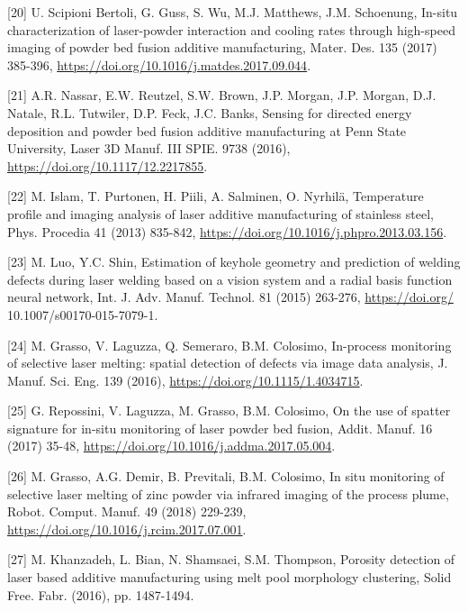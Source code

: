 \documentclass[10pt]{article}
\begin{document}
[20] U. Scipioni Bertoli, G. Guss, S. Wu, M.J. Matthews, J.M. Schoenung, In-situ characterization of laser-powder interaction and cooling rates through high-speed imaging of powder bed fusion additive manufacturing, Mater. Des. 135 (2017) 385-396, \href{https://doi.org/10.1016/j.matdes.2017.09.044}{https://doi.org/10.1016/j.matdes.2017.09.044}.

[21] A.R. Nassar, E.W. Reutzel, S.W. Brown, J.P. Morgan, J.P. Morgan, D.J. Natale, R.L. Tutwiler, D.P. Feck, J.C. Banks, Sensing for directed energy deposition and powder bed fusion additive manufacturing at Penn State University, Laser 3D Manuf. III SPIE. 9738 (2016), \href{https://doi.org/10.1117/12.2217855}{https://doi.org/10.1117/12.2217855}.

[22] M. Islam, T. Purtonen, H. Piili, A. Salminen, O. Nyrhilä, Temperature profile and imaging analysis of laser additive manufacturing of stainless steel, Phys. Procedia 41 (2013) 835-842, \href{https://doi.org/10.1016/j.phpro.2013.03.156}{https://doi.org/10.1016/j.phpro.2013.03.156}.

[23] M. Luo, Y.C. Shin, Estimation of keyhole geometry and prediction of welding defects during laser welding based on a vision system and a radial basis function neural network, Int. J. Adv. Manuf. Technol. 81 (2015) 263-276, \href{https://doi.org/}{https://doi.org/} 10.1007/s00170-015-7079-1.

[24] M. Grasso, V. Laguzza, Q. Semeraro, B.M. Colosimo, In-process monitoring of selective laser melting: spatial detection of defects via image data analysis, J. Manuf. Sci. Eng. 139 (2016), \href{https://doi.org/10.1115/1.4034715}{https://doi.org/10.1115/1.4034715}.

[25] G. Repossini, V. Laguzza, M. Grasso, B.M. Colosimo, On the use of spatter signature for in-situ monitoring of laser powder bed fusion, Addit. Manuf. 16 (2017) 35-48, \href{https://doi.org/10.1016/j.addma.2017.05.004}{https://doi.org/10.1016/j.addma.2017.05.004}.

[26] M. Grasso, A.G. Demir, B. Previtali, B.M. Colosimo, In situ monitoring of selective laser melting of zinc powder via infrared imaging of the process plume, Robot. Comput. Manuf. 49 (2018) 229-239, \href{https://doi.org/10.1016/j.rcim.2017.07.001}{https://doi.org/10.1016/j.rcim.2017.07.001}.

[27] M. Khanzadeh, L. Bian, N. Shamsaei, S.M. Thompson, Porosity detection of laser based additive manufacturing using melt pool morphology clustering, Solid Free. Fabr. (2016), pp. 1487-1494.
\end{document}
